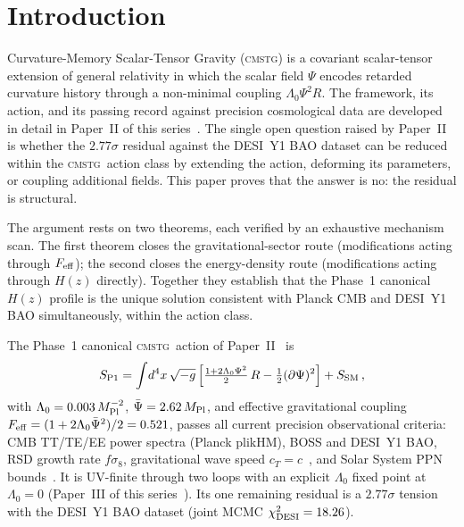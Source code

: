 \documentclass[12pt,a4paper]{article}
\newcommand{\CMSTG}{\textsc{cmstg}}
\newcommand{\Psibar}{\bar\Psi}
\newcommand{\Feff}{F_{\rm eff}}
\newcommand{\Lz}{\Lambda_0}
\newcommand{\Mpl}{M_{\rm Pl}}
\theoremstyle{plain}
\begin{document}
\tableofcontents
\bigskip

\section{Introduction}
\label{sec:intro}

Curvature-Memory Scalar-Tensor Gravity (\CMSTG) is a covariant scalar-tensor
extension of general relativity in which the scalar field $\Psi$ encodes
retarded curvature history through a non-minimal coupling $\Lz\Psi^2 R$. The
framework, its action, and its passing record against precision cosmological
data are developed in detail in Paper~II of this series~\cite{WilsonPaperII}.
The single open question raised by Paper~II is whether the $2.77\sigma$
residual against the DESI~Y1 BAO dataset can be reduced within the \CMSTG\
action class by extending the action, deforming its parameters, or coupling
additional fields. This paper proves that the answer is no: the residual is
structural.

The argument rests on two theorems, each verified by an exhaustive mechanism
scan. The first theorem closes the gravitational-sector route (modifications
acting through $\Feff$); the second closes the energy-density route
(modifications acting through $H(z)$ directly). Together they establish that
the Phase~1 canonical $H(z)$ profile is the unique solution consistent with
Planck CMB and DESI~Y1 BAO simultaneously, within the action class.

The Phase~1 canonical \CMSTG\ action of Paper~II~\cite{WilsonPaperII} is
\begin{equation}
  S_{\rm P1} = \int\!d^4x\,\sqrt{-g}\,\Bigl[
    \tfrac{1+2\Lz\Psi^2}{2}\,R
    - \tfrac{1}{2}(\partial\Psi)^2
  \Bigr] + S_{\rm SM}\,,
  \label{eq:phase1-action}
\end{equation}
with $\Lz = 0.003\,\Mpl^{-2}$, $\Psibar = 2.62\,\Mpl$, and effective
gravitational coupling $\Feff = (1+2\Lz\Psibar^2)/2 = 0.521$, passes all
current precision observational criteria: CMB TT/TE/EE power spectra (Planck
plikHM), BOSS and DESI~Y1 BAO, RSD growth rate $f\sigma_8$, gravitational wave
speed $c_T=c$~\cite{Abbott2017,Creminelli2017}, and Solar System PPN bounds~\cite{Planck2018,BOSS2017,DESI2024}.
It is UV-finite through two loops with an explicit $\Lz$ fixed point at
$\Lz=0$ (Paper~III of this series~\cite{WilsonPaperIII}). Its one
remaining residual is a $2.77\sigma$ tension with the DESI~Y1 BAO dataset
(joint MCMC $\chi^2_{\rm DESI}=18.26$).
\end{document}
